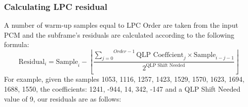 
\subsubsection{Calculating LPC residual}

A number of warm-up samples equal to LPC Order are taken from the input PCM
and the subframe's residuals are calculated according to the following formula:
\begin{equation}
\text{Residual}_i = \text{Sample}_i -
\left \lfloor \frac{\overset{Order - 1}{\underset{j = 0}{\sum}}
  \text{QLP Coeffcient}_j \times \text{Sample}_{i - j - 1} }{
2 ^ \text{QLP Shift Needed}} \right \rfloor
\end{equation}
For example, given the samples
1053, 1116, 1257, 1423, 1529, 1570, 1623, 1694, 1688, 1550,
the coefficients: 1241, -944, 14, 342, -147
and a QLP Shift Needed value of 9, our residuals are as follows:
